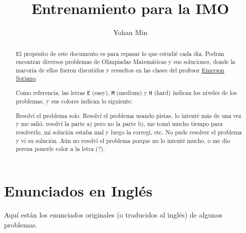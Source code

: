 \documentclass[11pt]{scrartcl}
\title{Entrenamiento para la IMO}
\author{Yohan Min}
\begin{document}
\maketitle

\begin{abstract}
	El propósito de este documento es para repasar lo que estudié cada día. Podrán encontrar diversos problemas de Olimpiadas Matemáticas y sus soluciones, donde la mayoría de ellos fueron discutidos y resueltos en las clases del profesor \href{https://www.facebook.com/emerson.sorianoperez}{Emerson Soriano}.
	
	Como referencia, las letras \verb|E| (easy), \verb|M| (medium) y \verb|H| (hard) indican los niveles de los problemas, y sus colores indican lo siguiente:
	\begin{description}[labelwidth=\widthof{\texttt{aaaaa}}+1.2em,leftmargin=\widthof{\texttt{aaaaa}a}+1.2em,align=right]
		 Resolví el problema solo.
		 Resolví el problema usando pistas, lo intenté más de una vez y me salió, resolví la parte a) pero no la parte b), me tomó mucho tiempo para resolverlo, mi solución estaba mal y luego la corregí, etc.
		 No pude resolver el problema y vi su solución.
		 Aún no resolví el problema porque no lo intenté mucho, o me dio pereza ponerle color a la letra (?).
	\end{description}
\end{abstract}

\tableofcontents















%
%
%

\section{Enunciados en Inglés}

Aquí están los enunciados originales (o traducidos al inglés) de algunos problemas.

\makehints
\clearpage
\printbibliography
\end{document}
